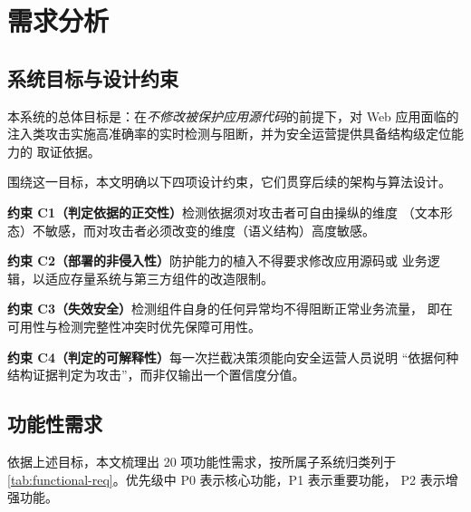 \section{需求分析}
\label{sec:requirements}

\subsection{系统目标与设计约束}

本系统的总体目标是：在\emph{不修改被保护应用源代码}的前提下，对 Web 应用面临的
注入类攻击实施高准确率的实时检测与阻断，并为安全运营提供具备结构级定位能力的
取证依据。

围绕这一目标，本文明确以下四项设计约束，它们贯穿后续的架构与算法设计。

\begin{keybox}
\textbf{约束 C1（判定依据的正交性）}\quad 检测依据须对攻击者可自由操纵的维度
（文本形态）不敏感，而对攻击者必须改变的维度（语义结构）高度敏感。

\textbf{约束 C2（部署的非侵入性）}\quad 防护能力的植入不得要求修改应用源码或
业务逻辑，以适应存量系统与第三方组件的改造限制。

\textbf{约束 C3（失效安全）}\quad 检测组件自身的任何异常均不得阻断正常业务流量，
即在可用性与检测完整性冲突时优先保障可用性。

\textbf{约束 C4（判定的可解释性）}\quad 每一次拦截决策须能向安全运营人员说明
“依据何种结构证据判定为攻击”，而非仅输出一个置信度分值。
\end{keybox}

\subsection{功能性需求}

依据上述目标，本文梳理出 20 项功能性需求，按所属子系统归类列于
\cref{tab:functional-req}。优先级中 P0 表示核心功能，P1 表示重要功能，
P2 表示增强功能。

